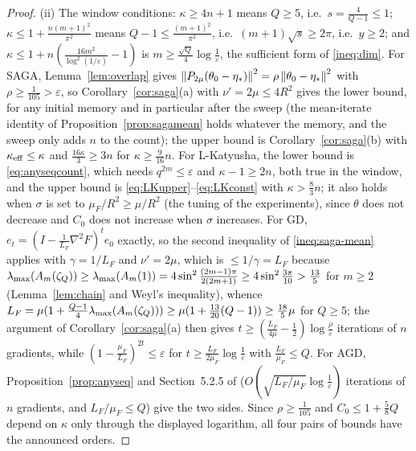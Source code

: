 \begin{proof}
(ii) The window conditions: $\kappa\ge4n+1$ means $Q\ge5$, i.e.\ $s=\frac4{Q-1}\le1$; $\kappa\le1+\frac{n(m+1)^2}{\pi^2}$ means $Q-1\le\frac{(m+1)^2}{\pi^2}$, i.e.\ $(m+1)\sqrt s\ge2\pi$, i.e.\ $y\ge2$; and $\kappa\le1+n(\frac{16m^2}{\log^2(1/\varepsilon)}-1)$ is $m\ge\frac{\sqrt Q}4\log\frac1\varepsilon$, the sufficient form of \eqref{ineq:dim}. For SAGA, Lemma~\ref{lem:overlap} gives $\left\|P_{2\mu}(\theta_0-\eta_\ast)\right\|^2=\rho\left\|\theta_0-\eta_\ast\right\|^2$ with $\rho\ge\frac1{105}>\varepsilon$, so Corollary~\ref{cor:saga}(a) with $\nu'=2\mu\le4R^2$ gives the lower bound, for any initial memory and in particular after the sweep (the mean-iterate identity of Proposition~\ref{prop:sagamean} holds whatever the memory, and the sweep only adds $n$ to the count); the upper bound is Corollary~\ref{cor:saga}(b) with $\kappa_{\rm eff}\le\kappa$ and $\frac{16\kappa}3\ge3n$ for $\kappa\ge\frac9{16}n$. For L-Katyusha, the lower bound is \eqref{eq:anyseqcount}, which needs $q^{2m}\le\varepsilon$ and $\kappa-1\ge2n$, both true in the window, and the upper bound is \eqref{eq:LKupper}--\eqref{eq:LKconst} with $\kappa>\frac83n$; it also holds when $\sigma$ is set to $\mu_F/R^2\ge\mu/R^2$ (the tuning of the experiments), since $\theta$ does not decrease and $C_0$ does not increase when $\sigma$ increases. For GD, $e_t=(I-\frac1{L_F}\nabla^2F)^te_0$ exactly, so the second inequality of \eqref{ineq:saga-mean} applies with $\gamma=1/L_F$ and $\nu'=2\mu$, which is $\le1/\gamma=L_F$ because $\lambda_{\max}(A_m(\zeta_Q))\ge\lambda_{\max}(A_m(1))=4\sin^2\frac{(2m-1)\pi}{2(2m+1)}\ge4\sin^2\frac{3\pi}{10}>\frac{13}5$ for $m\ge2$ (Lemma~\ref{lem:chain} and Weyl's inequality), whence $L_F=\mu(1+\frac{Q-1}4\lambda_{\max}(A_m(\zeta_Q)))\ge\mu(1+\frac{13}{20}(Q-1))\ge\frac{18}5\mu$ for $Q\ge5$; the argument of Corollary~\ref{cor:saga}(a) then gives $t\ge(\frac{L_F}{4\mu}-\frac12)\log\frac\rho\varepsilon$ iterations of $n$ gradients, while $(1-\frac{\mu_F}{L_F})^{2t}\le\varepsilon$ for $t\ge\frac{L_F}{2\mu_F}\log\frac1\varepsilon$ with $\frac{L_F}{\mu_F}\le Q$. For AGD, Proposition~\ref{prop:anyseq} and Section~5.2.5 of \cite{bach2024learning} ($O(\sqrt{L_F/\mu_F}\log\frac1\varepsilon)$ iterations of $n$ gradients, and $L_F/\mu_F\le Q$) give the two sides. Since $\rho\ge\frac1{105}$ and $C_0\le1+\frac58Q$ depend on $\kappa$ only through the displayed logarithm, all four pairs of bounds have the announced orders.


\end{proof}
